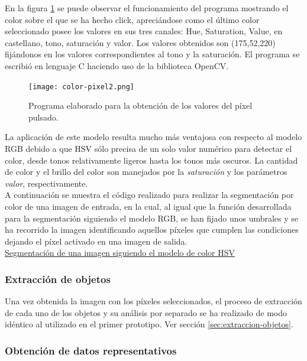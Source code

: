  En la figura \ref{fig:color-pixel2} se puede observar el funcionamiento del programa mostrando el color sobre el que se ha hecho click, apreciándose como el último color seleccionado posee los valores en sus tres canales: Hue, Saturation, Value, en castellano, tono, saturación y valor. Los valores obtenidos son (175,52,220) fijándonos en los valores correspondientes al tono y la saturación. El programa se escribió en lenguaje C haciendo uso de la biblioteca OpenCV.\\

\begin{figure}[H]
  \begin{center}
    \texttt{[image: color-pixel2.png]}
  \end{center}
  \caption{Programa elaborado para la obtención de los valores del píxel pulsado.}
  \label{fig:color-pixel2}
\end{figure}

La aplicación de este modelo resulta mucho más ventajosa con respecto al modelo RGB debido a que HSV sólo precisa de un solo valor numérico para detectar el color, desde tonos relativamente ligeros hasta los tonos más oscuros. La cantidad de color y el brillo del color son manejados por la \emph{saturación} y los parámetros \emph{valor}, respectivamente.\\

A continuación se muestra el código realizado para realizar la segmentación por color de una imagen de entrada, en la cual, al igual que la función desarrollada para la segmentación siguiendo el modelo RGB, se han fijado unos umbrales y se ha recorrido la imagen identificando aquellos píxeles que cumplen las condiciones dejando el píxel activado en una imagen de salida.\\

\underline{Segmentación de una imagen siguiendo el modelo de color HSV}\\



\subsubsection{Extracción de objetos}

Una vez obtenida la imagen con los píxeles seleccionados, el proceso de extracción de cada uno de los objetos y su análisis por separado se ha realizado de modo idéntico al utilizado en el primer prototipo. Ver sección \ref{sec:extraccion-objetos}.

\subsubsection {Obtención de datos representativos}

